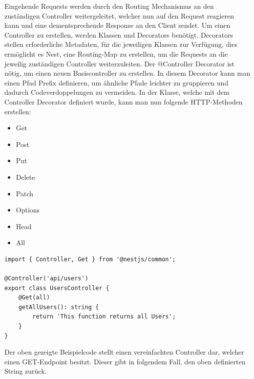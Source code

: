 Eingehende Requests werden durch den Routing Mechanismus an den zuständigen Controller weitergeleitet, welcher nun auf den Request reagieren kann und eine dementsprechende Response an den Client sendet. Um einen Controller zu erstellen, werden Klassen und Decorators benötigt. Decorators stellen erforderliche Metadaten, für die jeweiligen Klassen zur Verfügung, dies ermöglicht es Nest, eine Routing-Map zu erstellen, um die Requests an die jeweilig zuständigen Controller weiterzuleiten.
\newline
Der @Controller Decorator ist nötig, um einen neuen Basiscontroller zu erstellen. In diesem Decorator kann man einen Pfad Prefix definieren, um ähnliche Pfade leichter zu gruppieren und dadurch Codeverdoppelungen zu vermeiden. In der Klasse, welche mit dem Controller Decorator definiert wurde, kann man nun folgende HTTP-Methoden erstellen:

\begin{itemize}
    \item Get
    \item Post
    \item Put
    \item Delete
    \item Patch
    \item Options
    \item Head
    \item All
\end{itemize}

\vspace{10mm}

\begin{lstlisting}
import { Controller, Get } from '@nestjs/common';

@Controller('api/users')
export class UsersController {
    @Get(all)
    getAllUsers(): string {
        return 'This function returns all Users';
    }
}
\end{lstlisting}

Der oben gezeigte Beispielcode stellt einen vereinfachten Controller dar, welcher einen GET-Endpoint besitzt. Dieser gibt in folgendem Fall, den oben definierten String zurück.
\cite{Nest_js_Controllers}



